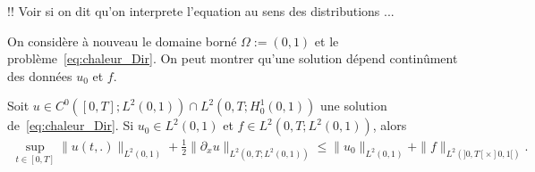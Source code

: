 \documentclass[12pt,a4paper,twoside]{article}
\begin{document}
!! Voir si on dit qu'on interprete l'equation au sens des distributions ...

On consid\`ere \`a nouveau le domaine born\'e $\Omega := (0,1)$
et le probl\`eme~\eqref{eq:chaleur_Dir}.
On peut montrer qu'une solution d\'epend contin\^ument des donn\'ees $u_0$ et $f$.
\begin{proposition}
  \label{prop:chaleur_continuite_donnees}
  Soit $u \in C^0([0,T];L^2(0,1)) \cap L^2(0,T;H_0^1(0,1))$ une solution de~\eqref{eq:chaleur_Dir}.
  Si $u_0 \in L^2(0,1)$ et $f \in L^2(0,T; L^2(0,1))$,
  alors 
  \begin{align}
    \label{eq:chaleur_continuite_donnees}
    \sup_{t \in [0,T]} \| u(t,.) \|_{L^2(0,1)} + \frac12 \| \partial_x u \|_{L^2(0,T;L^2(0,1))}
    \leq \| u_0 \|_{L^2(0,1)} + \| f \|_{L^2(]0,T[ \times ]0,1[)} .
  \end{align}
\end{proposition}
\end{document}
